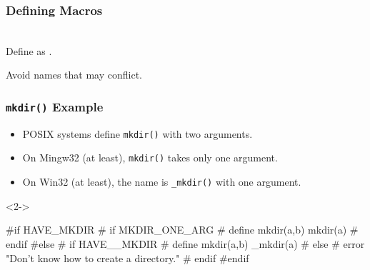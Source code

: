 \documentclass{beamer}
\newcommand{\variable}[1]{{\color{violet}{\textsf{#1}}}}
\begin{document}
\begin{frame}
\frametitle{Defining Macros}

\begin{description}[xx]
\item<1->[\texttt{AC\_DEFUN(\variable{MACRO-NAME}, \variable{MACRO-BODY})}]~\\
  Define \variable{MACRO-NAME} as \variable{MACRO-BODY}.
\end{description}

\alert<1>{Avoid names that may conflict.}  

\end{frame}

\begin{frame}[fragile]
\frametitle{\texttt{mkdir()} Example}

\begin{itemize}
\item POSIX systems define \texttt{mkdir()} with two arguments.
\item On Mingw32 (at least), \texttt{mkdir()} takes only one argument.
\item On Win32 (at least), the name is \texttt{\_mkdir()} with one argument.
\end{itemize}
\vspace{-.5ex}
\begin{block}<2->{}
\begin{semiverbatim}
#if \alert<3>{HAVE_MKDIR}
# if \alert<3>{MKDIR_ONE_ARG}
#  define mkdir(a,b) mkdir(a)
# endif
#else
# if \alert<3>{HAVE__MKDIR}
#  define mkdir(a,b) _mkdir(a)
# else
#  error "Don't know how to create a directory."
# endif
#endif
\end{semiverbatim}
\end{block}
\vspace{-.5ex}
\end{frame}
\end{document}
